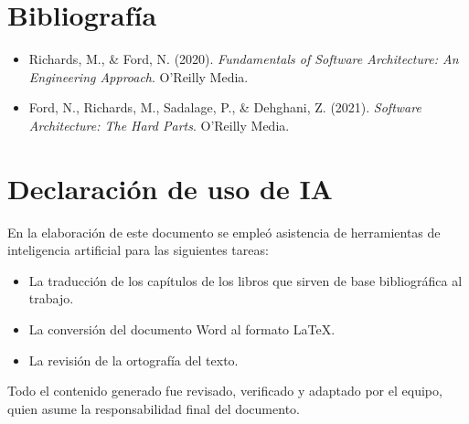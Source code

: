 \documentclass[12pt, a4paper]{article}
\begin{document}
    \section{Bibliografía}

    \begin{itemize}

        \item Richards, M., \& Ford, N. (2020). \textit{Fundamentals of Software Architecture: An Engineering Approach}. O'Reilly Media.

        \item Ford, N., Richards, M., Sadalage, P., \& Dehghani, Z. (2021). \textit{Software Architecture: The Hard Parts}. O'Reilly Media.

    \end{itemize}

    \newpage
    \section{Declaración de uso de IA}

    En la elaboración de este documento se empleó asistencia de herramientas de inteligencia artificial para las siguientes tareas:

    \begin{itemize}
        \item La traducción de los capítulos de los libros que sirven de base bibliográfica al trabajo.
        \item La conversión del documento Word al formato LaTeX.
        \item La revisión de la ortografía del texto.
    \end{itemize}

    Todo el contenido generado fue revisado, verificado y adaptado por el equipo, quien asume la responsabilidad final del documento.
\end{document}
